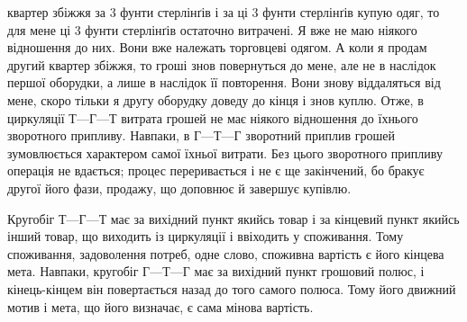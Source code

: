 \parcont{}  %
квартер збіжжя за 3 фунти стерлінґів і за ці 3 фунти стерлінґів
купую одяг, то для мене ці 3 фунти стерлінґів остаточно витрачені.
Я вже не маю ніякого відношення до них. Вони вже належать
торговцеві одягом. А коли я продам другий квартер збіжжя,
то гроші знов повернуться до мене, але не в наслідок першої
оборудки, а лише в наслідок її повторення. Вони знову віддаляться
від мене, скоро тільки я другу оборудку доведу до кінця
і знов куплю. Отже, в циркуляції $Т — Г — Т$ витрата грошей
не має ніякого відношення до їхнього зворотного припливу. Навпаки,
в $Г — Т — Г$ зворотний приплив грошей зумовлюється
характером самої їхньої витрати. Без цього зворотного припливу
операція не вдається; процес переривається і не є ще закінчений,
бо бракує другої його фази, продажу, що доповнює й завершує
купівлю.

Кругобіг $Т — Г — Т$ має за вихідний пункт якийсь товар і
за кінцевий пункт якийсь інший товар, що виходить із циркуляції
і ввіходить у споживання. Тому споживання, задоволення
потреб, одне слово, споживна вартість є його кінцева мета.
Навпаки, кругобіг $Г — Т — Г$ має за вихідний пункт грошовий
полюс, і кінець-кінцем він повертається назад до того самого
полюса. Тому його движний мотив і мета, що його визначає, є
сама мінова вартість.

